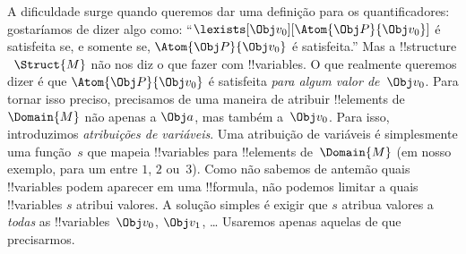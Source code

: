 \documentclass[../../../include/open-logic-section]{subfiles}
\begin{document}
A dificuldade surge quando queremos dar uma definição para os
quantificadores: gostaríamos de dizer algo como: ``$\lexists[\Obj
v_0][\Atom{\Obj P}{\Obj v_0}]$ é satisfeita se, e somente se,
$\Atom{\Obj P}{\Obj v_0}$ é satisfeita.'' Mas a !!{structure}
~$\Struct{M}$ não nos diz o que fazer com !!{variable}s. O que
realmente queremos dizer é que $\Atom{\Obj P}{\Obj v_0}$ é satisfeita
\emph{para algum valor de~$\Obj v_0$}.  Para tornar isso preciso,
precisamos de uma maneira de atribuir !!{element}s de~$\Domain{M}$ não
apenas a $\Obj a$, mas também a~$\Obj v_0$. Para isso, introduzimos
\emph{atribuições de variáveis}. Uma atribuição de variáveis é
simplesmente uma função~$s$ que mapeia !!{variable}s para
!!{element}s de~$\Domain{M}$ (em nosso exemplo, para um entre $1$,
$2$ ou~$3$).  Como não sabemos de antemão quais !!{variable}s podem
aparecer em uma !!{formula}, não podemos limitar a quais !!{variable}s
$s$ atribui valores. A solução simples é exigir que $s$ atribua valores
a \emph{todas} as !!{variable}s~$\Obj v_0$, $\Obj v_1$, \dots\@
Usaremos apenas aquelas de que precisarmos.
\end{document}
